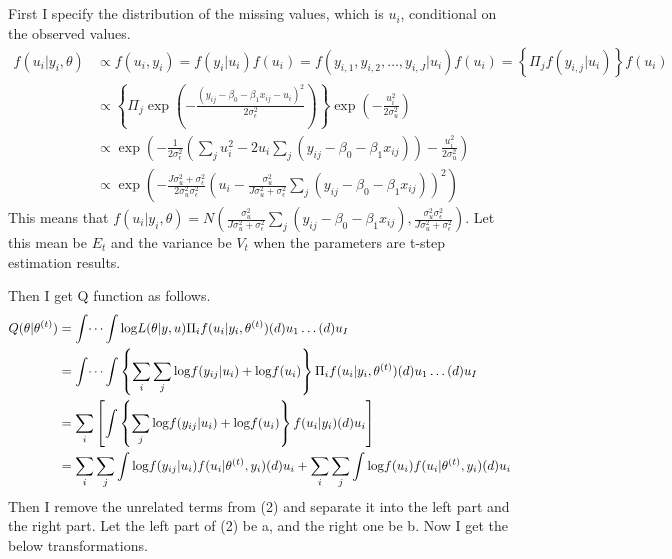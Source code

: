 \documentclass{article}
\begin{document}
	\subsection{}
		First I specify the distribution of the missing values, which is $u_i$, conditional on the observed values.
		\begin{align*}
			f(u_i | y_i, \theta) &\propto f(u_i, y_i) = f(y_i | u_i) f(u_i) = f(y_{i, 1}, y_{i, 2}, \dots, y_{i, J} | u_i) f(u_i) = \left\{ \Pi_j f(y_{i, j} | u_i)\right\} f(u_i)\\[10pt]
			&\propto \left\{ \Pi_j \exp(-\frac{(y_{ij} - \beta_0 -\beta_1 x_{ij} - u_i)^2}{2\sigma_{\epsilon}^2}) \right\} \exp(-\frac{u_i^2}{2\sigma_u^2})\\[10pt]
			&\propto \exp \left(-\frac{1}{2\sigma_\epsilon^2} \left( \sum_j u_i^2 - 2u_i \sum_j (y_{ij} - \beta_0 - \beta_1 x_{ij}) \right) - \frac{u_i^2}{2\sigma_u^2} \right)\\[10pt]
			&\propto \exp \left( -\frac{J\sigma_u^2 + \sigma_\epsilon^2}{2\sigma_u^2 \sigma_\epsilon^2} \left( u_i - \frac{\sigma_u^2}{J\sigma_u^2 + \sigma_\epsilon^2} \sum_j (y_{ij} - \beta_0 - \beta_1 x_{ij}) \right)^2 \right)
		\end{align*}
		This means that $f(u_i | y_i , \theta) = N\left( \frac{\sigma_u^2}{J\sigma_u^2 + \sigma_\epsilon^2} \sum_j (y_{ij} - \beta_0 - \beta_1 x_{ij}), \frac{\sigma_u^2 \sigma_\epsilon^2}{J\sigma_u^2 + \sigma_\epsilon^2} \right)$. Let this mean be $E_t$ and the variance be $V_t$ when the parameters are t-step estimation results.\par
		Then I get Q function as follows.
		\begin{align}
			Q(\theta | \theta^{(t)}) &= \int \dots \int {\rm log} L(\theta | y, u) \Pi_i f(u_i | y_i, \theta^{(t)}) \mathrm(d)u_1 \dots \mathrm(d)u_I \nonumber \\
			&= \int \dots \int \left\{ \sum_i \sum_j {\rm log} f(y_{ij} | u_i) + {\rm log} f(u_i) \right\} \Pi_i f(u_i | y_i, \theta^{(t)}) \mathrm(d)u_1 \dots \mathrm(d)u_I \nonumber \\
			&= \sum_i \left[ \int \left\{ \sum_j {\rm log} f(y_{ij} | u_i) + {\rm log} f(u_i) \right\} f(u_i | y_i) \mathrm(d)u_i \right] \nonumber \\
			&= \sum_i \sum_j \int {\rm log} f(y_{ij} | u_i) f(u_i | \theta^{(t)}, y_i) \mathrm(d)u_i + \sum_i \sum_j \int {\rm log} f(u_i) f(u_i | \theta^{(t)}, y_i) \mathrm(d)u_i 
		\end{align}
		Then I remove the unrelated terms from (2) and separate it into the left part and the right part. Let the left part of (2) be a, and the right one be b. Now I get the below transformations.
\end{document}
